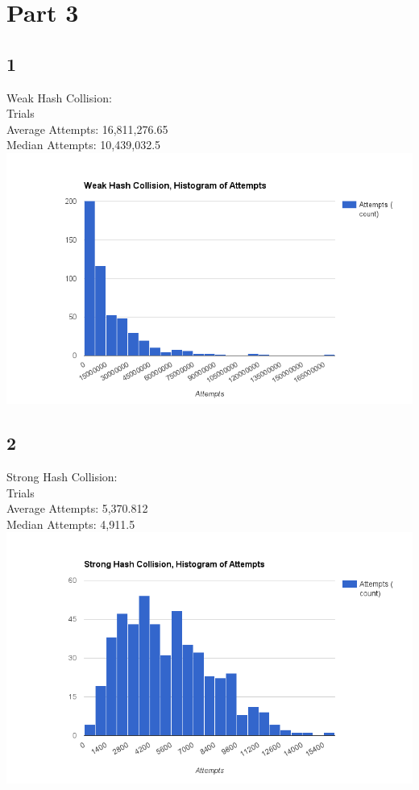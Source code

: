 \documentclass[10pt,letterpaper]{article}
\begin{document}
\section*{Part 3}
\subsection*{1}
\noindent Weak Hash Collision:\\
 Trials \\ Average Attempts: 16,811,276.65\\ Median Attempts: 10,439,032.5\\

\includegraphics[scale=.5]{weak.png}

\subsection*{2}
Strong Hash Collision:\\
 Trials\\ Average Attempts: 5,370.812\\ Median Attempts: 4,911.5\\

\includegraphics[scale=.5]{strong.png}
\end{document}
